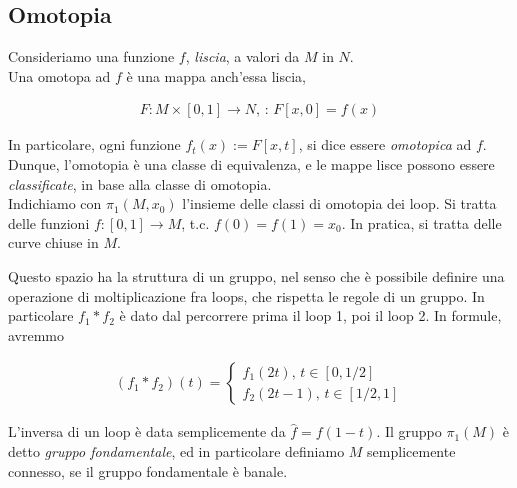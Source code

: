 \documentclass{report}
\begin{document}
\subsection{Omotopia}

Consideriamo una funzione \(f\), \emph{liscia}, a valori da \(M\) in \(N\). \\

Una omotopa ad \(f\) è una mappa anch'essa liscia, 

\begin{align}
    F: M \times [0, 1] \rightarrow N, \, : \, F[x, 0] = f(x)
\end{align}

In particolare, ogni funzione \(f_t(x):= F[x, t]\), si dice essere \emph{omotopica} ad \(f\). Dunque, l'omotopia è una classe di equivalenza, e le mappe lisce possono essere \emph{classificate}, in base alla classe di omotopia. \\

Indichiamo con \(\pi_1(M, x_0)\) l'insieme delle classi di omotopia dei loop. Si tratta delle funzioni \(f: [0,1] \rightarrow M\), t.c. \(f(0) = f(1) = x_0\). In pratica, si tratta delle curve chiuse in \(M\). 

Questo spazio ha la struttura di un gruppo, nel senso che è possibile definire una operazione di moltiplicazione fra loops, che rispetta le regole di un gruppo. In particolare \(f_1 * f_2\) è dato dal percorrere prima il loop 1, poi il loop 2. In formule, avremmo 

\begin{align}
    (f_1 * f_2)(t) = \begin{cases}
        f_1 (2t), \, t \in [0, 1/2] \\ f_2(2t-1), \, t \in [1/2, 1] 
    \end{cases} 
\end{align}

L'inversa di un loop è data semplicemente da \(\hat{f} = f(1-t)\). Il gruppo \(\pi_1(M)\) è detto \emph{gruppo fondamentale}, ed in particolare definiamo \(M\) semplicemente connesso, se il gruppo fondamentale è banale. 

\end{document}
